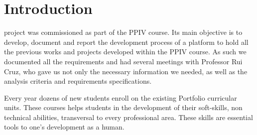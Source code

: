 \documentclass[a4paper,12pt,journal,twoside,compsoc]{PPIEEEtran}
\begin{document}

\maketitle

\IEEEdisplaynontitleabstractindextext
\IEEEpeerreviewmaketitle
\section{Introduction}
% 
% 
 project was commissioned as part of the PPIV course. Its main objective is to develop, document and report the development process of a platform to hold all the previous works and projects developed within the PPIV course. As such we documented all the requirements and had several meetings with Professor Rui Cruz, who gave us not only the necessary information we needed, as well as the analysis criteria and requirements specifications.

Every year dozens of new students enroll on the existing Portfolio curricular units. These courses helps students in the development of their soft-skills, non technical abilities, transversal to every professional area. These skills are essential tools to one's development as a human.
\end{document}

